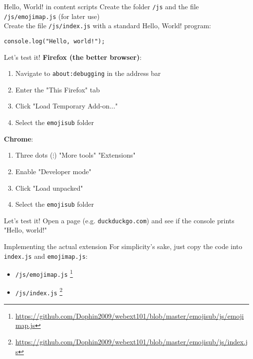 \documentclass[../index.tex]{subfiles}
\begin{document}
\renewcommand{\currenttitle}{Hello, World! in content scripts}
\begin{frame}[fragile]{\currenttitle}
  Create the folder \texttt{/js} and the file \texttt{/js/emojimap.js} (for later use) \\[1.5em]

  Create the file \texttt{/js/index.js} with a standard Hello, World! program:
  \begin{lstlisting}[language=ES6,basicstyle=\ttfamily\small]
    console.log("Hello, world!");
  \end{lstlisting}
\end{frame}

\renewcommand{\currenttitle}{Let's test it!}
\begin{frame}[fragile]{\currenttitle}
  \textbf{Firefox (the better browser)}:
  \begin{enumerate}
    \small
    \item Navigate to \texttt{about:debugging} in the address bar
    \item Enter the "This Firefox" tab
    \item Click "Load Temporary Add-on..."
    \item Select the \texttt{emojisub} folder
  \end{enumerate}

  \textbf{Chrome}:
  \begin{enumerate}
    \small
    \item Three dots ($\vdots$) \textrightarrow "More tools" \textrightarrow
          "Extensions"
    \item Enable "Developer mode"
    \item Click "Load unpacked"
    \item Select the \texttt{emojisub} folder
  \end{enumerate}
\end{frame}

\begin{frame}[fragile]{\currenttitle}
  Open a page (e.g. \texttt{duckduckgo.com}) and see if the console prints
  "Hello, world!"
\end{frame}

\renewcommand{\currenttitle}{Implementing the actual extension}
\begin{frame}[fragile]{\currenttitle}
  For simplicity's sake, just copy the code into \texttt{index.js} and
  \texttt{emojimap.js}:

  \begin{itemize}
    \item \texttt{/js/emojimap.js}
          \footnote{\scriptsize \url{https://github.com/Dophin2009/webext101/blob/master/emojisub/js/emojimap.js}}
    \item \texttt{/js/index.js}
          \footnote{\scriptsize \url{https://github.com/Dophin2009/webext101/blob/master/emojisub/js/index.js}}
  \end{itemize}

\end{frame}
\end{document}
